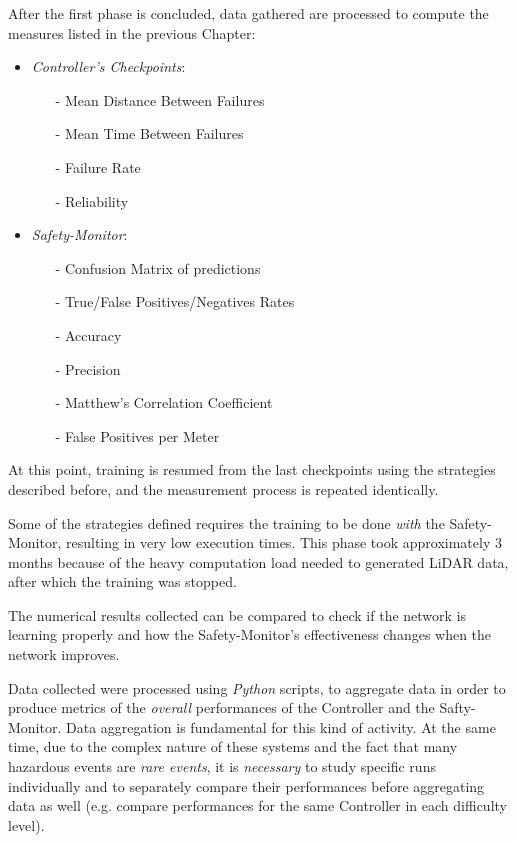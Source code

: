 After the first phase is concluded, data gathered are processed to compute the measures listed in the previous Chapter:

\begin{itemize}
	\item \textsl{Controller's Checkpoints}:
	\begin{itemize}
		\item[-] Mean Distance Between Failures
		\item[-] Mean Time Between Failures
		\item[-] Failure Rate
		\item[-] Reliability
	\end{itemize}
	\item \textsl{Safety-Monitor}:
	\begin{itemize}
		\item[-] Confusion Matrix of predictions
		\item[-] True/False Positives/Negatives Rates
		\item[-] Accuracy
		\item[-] Precision
		\item[-] Matthew's Correlation Coefficient
		\item[-] False Positives per Meter
	\end{itemize}
\end{itemize}

At this point, training is resumed from the last checkpoints using the strategies described before, and the measurement process is repeated identically.

Some of the strategies defined requires the training to be done \textsl{with} the Safety-Monitor, resulting in very low execution times. This phase took approximately 3 months because of the heavy computation load needed to generated LiDAR data, after which the training was stopped.

The numerical results collected can be compared to check if the network is learning properly and how the Safety-Monitor's effectiveness changes when the network improves.

Data collected were processed using \textsl{Python} scripts, to aggregate data in order to produce metrics of the \textsl{overall} performances of the Controller and the Safty-Monitor.
Data aggregation is fundamental for this kind of activity. At the same time, due to the complex nature of these systems and the fact that many hazardous events are \textsl{rare events}, it is \textsl{necessary} to study specific runs individually and to separately compare their performances before aggregating data as well (e.g. compare performances for the same Controller in each difficulty level).

